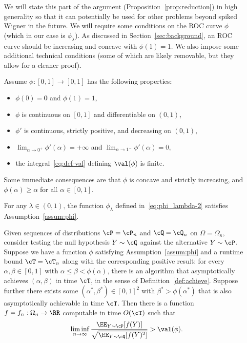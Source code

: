 \documentclass[11pt]{article}
\begin{document}
We will state this part of the argument (Proposition~\ref{prop:reduction}) in high generality so that it can potentially be used for other problems beyond spiked Wigner in the future. We will require some conditions on the ROC curve $\phi$ (which in our case is $\phi_\lambda$). As discussed in Section~\ref{sec:background}, an ROC curve should be increasing and concave with $\phi(1) = 1$. We also impose some additional technical conditions (some of which are likely removable, but they allow for a cleaner proof).

\begin{assumption}\label{assum:phi}
Assume $\phi: [0,1] \to [0,1]$ has the following properties:
\begin{itemize}
\item $\phi(0) = 0$ and $\phi(1) = 1$,
\item $\phi$ is continuous on $[0,1]$ and differentiable on $(0,1)$,
\item $\phi'$ is continuous, strictly positive, and decreasing on $(0,1)$,
\item $\lim_{\alpha \to 0^+} \phi'(\alpha) = +\infty$ and $\lim_{\alpha \to 1^-} \phi'(\alpha) = 0$,
\item the integral~\eqref{eq:def-val} defining $\val(\phi)$ is finite.
\end{itemize}
\end{assumption}

\noindent Some immediate consequences are that $\phi$ is concave and strictly increasing, and $\phi(\alpha) \ge \alpha$ for all $\alpha \in [0,1]$.

\begin{lemma}\label{lem:check-phi-assum}
For any $\lambda \in (0,1)$, the function $\phi_\lambda$ defined in~\eqref{eq:phi_lambda-2} satisfies Assumption~\ref{assum:phi}.
\end{lemma}

\begin{proposition}\label{prop:reduction}
Given sequences of distributions $\cP = \cP_n$ and $\cQ = \cQ_n$ on $\Omega = \Omega_n$, consider testing the null hypothesis $Y \sim \cQ$ against the alternative $Y \sim \cP$. Suppose we have a function $\phi$ satisfying Assumption~\ref{assum:phi} and a runtime bound $\cT = \cT_n$ along with the corresponding positive result: for every $\alpha,\beta \in [0,1]$ with $\alpha \le \beta < \phi(\alpha)$, there is an algorithm that asymptotically achieves $(\alpha,\beta)$ in time $\cT$, in the sense of Definition~\ref{def:achieve}. Suppose further there exists some $(\alpha^*,\beta^*) \in [0,1]^2$ with $\beta^* > \phi(\alpha^*)$ that is also asymptotically achievable in time $\cT$. Then there is a function $f = f_n: \Omega_n \to \RR$ computable in time $O(\cT)$ such that
\begin{equation}\label{eq:ratio-goal}
\liminf_{n \to \infty} \frac{\EE_{Y \sim \cP}[f(Y)]}{\sqrt{\EE_{Y \sim \cQ}[f(Y)^2]}} > \val(\phi).
\end{equation}
\end{proposition}
\end{document}
